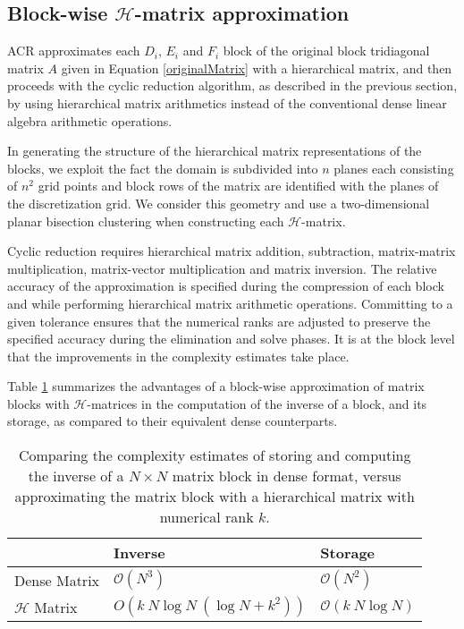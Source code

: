 \documentclass[]{elsarticle}
\begin{document}
\subsection{Block-wise $\mathcal{H}$-matrix approximation}

ACR approximates each $D_i$, $E_i$ and $F_i$ block of the original block tridiagonal matrix $A$ given in Equation \ref{originalMatrix} with a hierarchical matrix, and then proceeds with the cyclic reduction algorithm, as described in the previous section, by using hierarchical matrix arithmetics instead of the conventional dense linear algebra arithmetic operations.

In generating the structure of the hierarchical matrix representations of the blocks, we exploit the fact the domain is subdivided into $n$ planes each consisting of $n^2$ grid points and block rows of the matrix are identified with the planes of the discretization grid. We consider this geometry and use a two-dimensional planar bisection clustering when constructing each $\mathcal{H}$-matrix. 

Cyclic reduction requires hierarchical matrix addition, subtraction, matrix-matrix multiplication, matrix-vector multiplication and matrix inversion. The relative accuracy of the approximation is specified during the compression of each block and while performing hierarchical matrix arithmetic operations. Committing to a given tolerance ensures that the numerical ranks are adjusted to preserve the specified accuracy during the elimination and solve phases. It is at the block level that the improvements in the complexity estimates take place.

Table \ref{advBlock} summarizes the advantages of a block-wise approximation of matrix blocks with $\mathcal{H}$-matrices in the computation of the inverse of a block, and its storage, as compared to their equivalent dense counterparts.

\begin{table}[H]
\centering
\begin{tabular}{l|l|l}
 					& Inverse 					& Storage\\ \hline
Dense Matrix 		& $\mathcal{O}(N^3)$ 		& $\mathcal{O}(N^2)$ \\
$\mathcal{H}$ Matrix & $O(k~N \log N~(\log N + k^2))$ & $\mathcal{O}(k~N \log N)$ \\
\end{tabular}
\caption{Comparing the complexity estimates of storing and computing the inverse of a $N \times N$ matrix block in dense format, versus approximating the matrix block with a hierarchical matrix with numerical rank $k$.}
\label{advBlock}
\end{table}
\end{document}
